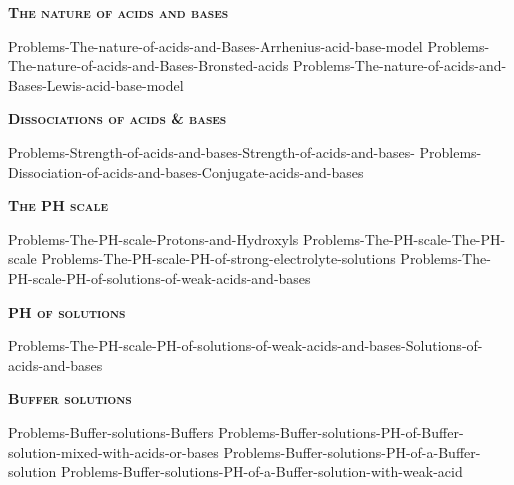 \documentclass[main.tex]{subfiles}
\newcommand\chapterlabel{Ch-acidbase}
\begin{document}
\newpage
 
\fancyhfoffset[E,O]{0pt}
\setlength{\columnsep}{30pt}
\begin{conclusion}
\end{conclusion}
\begin{multicols*}{2}\setcounter{numA}{1}
{\raggedright\textsc{\textbf{The nature of acids and bases}}\par}
 {Problems-The-nature-of-acids-and-Bases-Arrhenius-acid-base-model}
 {Problems-The-nature-of-acids-and-Bases-Bronsted-acids}
 {Problems-The-nature-of-acids-and-Bases-Lewis-acid-base-model}%

{\raggedright\textsc{\textbf{Dissociations of acids \& bases}}\par}
 {Problems-Strength-of-acids-and-bases-Strength-of-acids-and-bases-}
 {Problems-Dissociation-of-acids-and-bases-Conjugate-acids-and-bases}
 
{\raggedright\textsc{\textbf{The PH scale}}\par}
 {Problems-The-PH-scale-Protons-and-Hydroxyls}
 {Problems-The-PH-scale-The-PH-scale}
 {Problems-The-PH-scale-PH-of-strong-electrolyte-solutions}%
 {Problems-The-PH-scale-PH-of-solutions-of-weak-acids-and-bases}%
			
{\raggedright\textsc{\textbf{PH of solutions}}\par}%
 {Problems-The-PH-scale-PH-of-solutions-of-weak-acids-and-bases-Solutions-of-acids-and-bases}%


{\raggedright\textsc{\textbf{Buffer solutions}}\par}
 {Problems-Buffer-solutions-Buffers}
 {Problems-Buffer-solutions-PH-of-Buffer-solution-mixed-with-acids-or-bases}%
 {Problems-Buffer-solutions-PH-of-a-Buffer-solution}
 {Problems-Buffer-solutions-PH-of-a-Buffer-solution-with-weak-acid}%


\end{multicols*}
\end{document}
